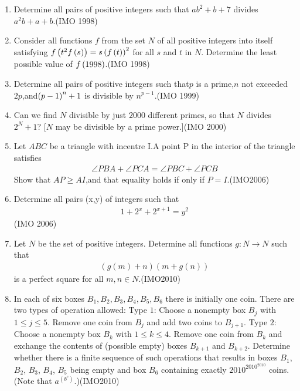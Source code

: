 \begin{enumerate}
\item Determine all pairs  of positive integers such that $ab^2 + b + 7$ divides $a^2    b + a + b$.\hfill(IMO 1998)

\item  Consider all functions $f$ from the set $N$ of all positive integers into itself satisfying $f\left(t^2f\left(s\right)\right) = s\left(f\left(t\right)\right)^2$ for all $s$ and $t$ in $N$. Determine the least possible value of ${f\left(1998\right)}$.\hfill(IMO 1998)

\item Determine all pairs  of positive integers such that$p$ is a prime,$n$ not exceeded $2p$,and$\left(p-1\right)^n+1$ is divisible by $n^{p-1}$.\hfill(IMO 1999)

\item Can we find $N$ divisible by just $2000$ different primes, so that $N$ divides $2^N + 1$? [$N$ may be divisible by a prime power.]\hfill(IMO 2000)    
\item Let $ABC$ be a triangle with incentre I.A point P in the interior of the triangle satisfies
\begin{align*}
\angle{PBA} + \angle{PCA} = \angle{PBC}+ \angle{PCB} \end{align*} 
Show that $AP\geq{AI}$,and that equality holds if only if $P=I$.\hfill(IMO2006)
\item Determine all pairs (x,y) of integers such that
 \begin{align*}
 1+2^{x}+2^{x+1}=y^{2}
 \end{align*}\hfill(IMO 2006)
 \item Let $N$ be the set of positive integers. Determine all functions $g:N \rightarrow N $ such that
				\begin{align}
					(g(m)+n) (m+g(n))
				\end{align}
				is a perfect square for all $m,n \in N $.\hfill(IMO2010)
			\item In each of six boxes $B_{1}, B_{2}, B_{3}, B_{4}, B_{5}, B_{6}$ there is initially one coin. There are two types of operation allowed:
				Type $1$: Choose a nonempty box $B_{j}$ with $1\leq{j}\leq{5}$. Remove one coin from $B_{j}$ and add two coins to $B_{j+1}$.
				Type $2$: Choose a nonempty box $B_{k}$ with $1\leq{k}\leq{4}$. Remove one coin from $B_{k}$ and exchange the contents of (possible empty) boxes $B_{k+1}$ and $B_{k+2}$.
				Determine whether there is a finite sequence of such operations that results in boxes $B_{1}$, $B_{2}$, $B_{3}$, $B_{4}$, $B_{5}$ being empty and box $B_{6}$ containing exactly $2010^{2010^{2010}}$ coins. (Note that $a^{(b^{c})}$.)\hfill(IMO2010)

\end{enumerate}
